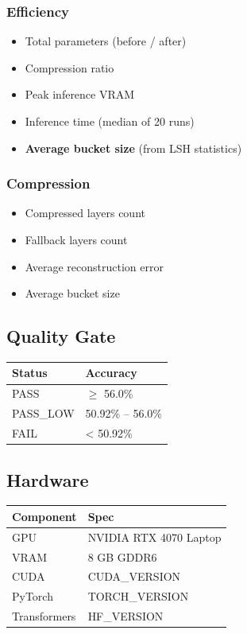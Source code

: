 \subsubsection{Efficiency}
\begin{itemize}
\item Total parameters (before / after)
\item Compression ratio
\item Peak inference VRAM
\item Inference time (median of 20 runs)
\item \textbf{Average bucket size} (from LSH statistics)

\end{itemize}
\subsubsection{Compression}
\begin{itemize}
\item Compressed layers count
\item Fallback layers count
\item Average reconstruction error
\item Average bucket size

\end{itemize}
\subsection{Quality Gate}

\begin{table}[H]
\centering
\small
\begin{tabular}{ll}
\toprule
\textbf{Status} & \textbf{Accuracy} \\
\midrule
PASS & $\ge$ 56.0\% \\
PASS\_LOW & 50.92\% -- 56.0\% \\
FAIL & < 50.92\% \\
\bottomrule
\end{tabular}
\end{table}

\subsection{Hardware}

\begin{table}[H]
\centering
\small
\begin{tabular}{ll}
\toprule
\textbf{Component} & \textbf{Spec} \\
\midrule
GPU & NVIDIA RTX 4070 Laptop \\
VRAM & 8 GB GDDR6 \\
CUDA & {{CUDA\_VERSION}} \\
PyTorch & {{TORCH\_VERSION}} \\
Transformers & {{HF\_VERSION}} \\
\bottomrule
\end{tabular}
\end{table}

